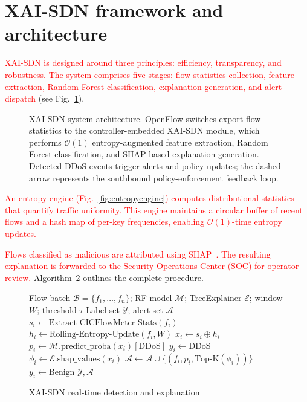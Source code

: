 \documentclass{ieeeaccess}
\begin{document}
\section{XAI-SDN framework and architecture}
\label{sec:framework}

\textcolor{red}{XAI-SDN is designed around three principles: efficiency, transparency, and robustness.} \textcolor{red}{The system comprises five stages: flow statistics collection, feature extraction, Random Forest classification, explanation generation, and alert dispatch} (see Fig.~\ref{fig:architecture}).

\begin{figure}[t]
\centering
\resizebox{\textwidth}{!}{%
%
}
\caption{XAI-SDN system architecture. OpenFlow switches export flow statistics to the controller-embedded XAI-SDN module, which performs $\mathcal{O}(1)$ entropy-augmented feature extraction, Random Forest classification, and SHAP-based explanation generation. Detected DDoS events trigger alerts and policy updates; the dashed arrow represents the southbound policy-enforcement feedback loop.}
\label{fig:architecture}
\end{figure}

\textcolor{red}{An entropy engine (Fig.~\ref{fig:entropyengine}) computes distributional statistics that quantify traffic uniformity.} \textcolor{red}{This engine maintains a circular buffer of recent flows and a hash map of per-key frequencies, enabling $\mathcal{O}(1)$-time entropy updates.}

\textcolor{red}{Flows classified as malicious are attributed using SHAP~\cite{lundberg2017shap}.} \textcolor{red}{The resulting explanation is forwarded to the Security Operations Center (SOC) for operator review.} Algorithm~\ref{alg:xaisdn} outlines the complete procedure.

\begin{figure}[!t][!t]
\caption{XAI-SDN real-time detection and explanation}
\label{alg:xaisdn}
\begin{algorithmic}[1]
\Require Flow batch $\mathcal{B}=\{f_1,\ldots,f_n\}$; RF model $\mathcal{M}$; TreeExplainer $\mathcal{E}$; window $W$; threshold $\tau$
\Ensure Label set $\mathcal{Y}$; alert set $\mathcal{A}$
    \State $s_i \gets \text{Extract-CICFlowMeter-Stats}(f_i)$
    \State $h_i \gets \text{Rolling-Entropy-Update}(f_i, W)$
    \State $x_i \gets s_i \oplus h_i$ 
    \State $p_i \gets \mathcal{M}.\text{predict\_proba}(x_i)[\text{DDoS}]$
        \State $y_i \gets \text{DDoS}$
        \State $\phi_i \gets \mathcal{E}.\text{shap\_values}(x_i)$
        \State $\mathcal{A} \gets \mathcal{A} \cup \{(f_i, p_i, \text{Top-K}(\phi_i))\}$
    \Else
        \State $y_i \gets \text{Benign}$
    \EndIf
\EndFor
\State \Return $\mathcal{Y}, \mathcal{A}$
\end{algorithmic}
\end{figure}
\end{document}
